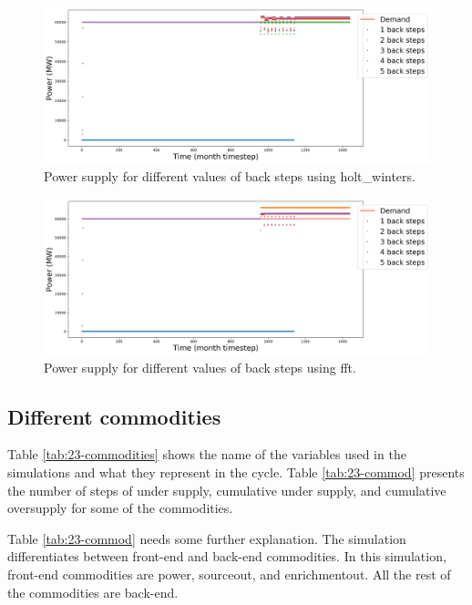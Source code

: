\documentclass[11pt]{article}
\begin{document}
\begin{figure}[H]
	\centering
	\includegraphics[width=\textwidth]{23-figures/23-power-buffer0-holt_winters-back.png} 
	\hfill
	\caption{Power supply for different values of back steps using holt\_winters.}
	\label{fig:23-back-hots_winters}
\end{figure}

\begin{figure}[H]
	\centering
	\includegraphics[width=\textwidth]{23-figures/23-power-buffer0-fft-back.png} 
	\hfill
	\caption{Power supply for different values of back steps using fft.}
	\label{fig:23-back-fft}
\end{figure}

\subsection{Different commodities}

Table \ref{tab:23-commodities} shows the name of the variables used in the simulations and what they represent in the cycle. Table \ref{tab:23-commod} presents the number of steps of under supply, cumulative under supply, and cumulative oversupply for some of the commodities.

Table \ref{tab:23-commod} needs some further explanation. The simulation differentiates between front-end and back-end commodities. In this simulation, front-end commodities are power, sourceout, and enrichmentout. All the rest of the commodities are back-end. 
\end{document}
